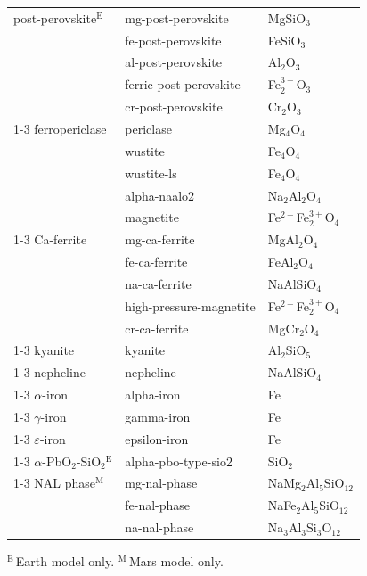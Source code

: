 \begin{landscape}
\begin{table}[p]
{\begin{tabular}[t]{@{}l l l@{}}
\midrule
post-perovskite$^{\mathrm{E}}$ & mg-post-perovskite & MgSiO$_{3}$ \\
 & fe-post-perovskite & FeSiO$_{3}$ \\
 & al-post-perovskite & Al$_{2}$O$_{3}$ \\
 & ferric-post-perovskite & Fe$^{3+}_{2}$O$_{3}$ \\
 & cr-post-perovskite & Cr$_{2}$O$_{3}$ \\
\cmidrule{1-3}
ferropericlase & periclase & Mg$_{4}$O$_{4}$ \\
 & wustite & Fe$_{4}$O$_{4}$ \\
 & wustite-ls & Fe$_{4}$O$_{4}$ \\
 & alpha-naalo2 & Na$_{2}$Al$_{2}$O$_{4}$ \\
 & magnetite & Fe$^{2+}$Fe$^{3+}_{2}$O$_{4}$ \\
\cmidrule{1-3}
Ca-ferrite & mg-ca-ferrite & MgAl$_{2}$O$_{4}$ \\
 & fe-ca-ferrite & FeAl$_{2}$O$_{4}$ \\
 & na-ca-ferrite & NaAlSiO$_{4}$ \\
 & high-pressure-magnetite & Fe$^{2+}$Fe$^{3+}_{2}$O$_{4}$ \\
 & cr-ca-ferrite & MgCr$_{2}$O$_{4}$ \\
\cmidrule{1-3}
kyanite & kyanite & Al$_{2}$SiO$_{5}$ \\
\cmidrule{1-3}
nepheline & nepheline & NaAlSiO$_{4}$ \\
\cmidrule{1-3}
$\alpha$-iron & alpha-iron & Fe \\
\cmidrule{1-3}
$\gamma$-iron & gamma-iron & Fe \\
\cmidrule{1-3}
$\varepsilon$-iron & epsilon-iron & Fe \\
\cmidrule{1-3}
$\alpha$-PbO$_2$-SiO$_2$$^{\mathrm{E}}$ & alpha-pbo-type-sio2 & SiO$_{2}$ \\
\cmidrule{1-3}
NAL phase$^{\mathrm{M}}$ & mg-nal-phase & NaMg$_{2}$Al$_{5}$SiO$_{12}$ \\
 & fe-nal-phase & NaFe$_{2}$Al$_{5}$SiO$_{12}$ \\
 & na-nal-phase & Na$_{3}$Al$_{3}$Si$_{3}$O$_{12}$ \\
\bottomrule
\end{tabular}
}
\par\medskip
\noindent $^{\mathrm{E}}$\,Earth model only. $^{\mathrm{M}}$\,Mars model only.
\end{table}
\end{landscape}
